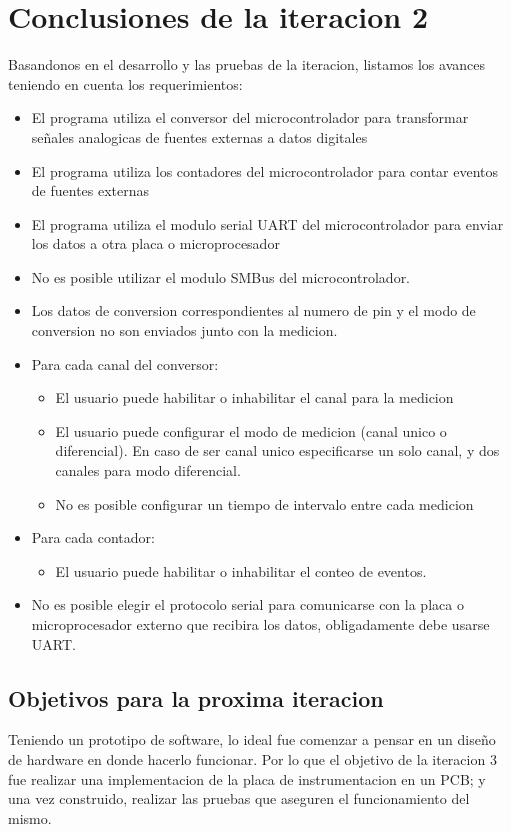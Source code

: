 \section{Conclusiones de la iteracion 2} %
\label{it2:sec:conclusiones_de_la_iteracion_2}

Basandonos en el desarrollo y las pruebas de la iteracion, listamos los avances teniendo en cuenta los requerimientos:

\begin{itemize}
\item El programa utiliza el conversor del microcontrolador para transformar señales analogicas de fuentes externas a datos digitales
\item El programa utiliza los contadores del microcontrolador para contar eventos de fuentes externas
\item El programa utiliza el modulo serial UART del microcontrolador para enviar los datos a otra placa o microprocesador
\item No es posible utilizar el modulo SMBus del microcontrolador.
\item Los datos de conversion correspondientes al numero de pin y el modo de conversion no son enviados junto con la medicion.
\item Para cada canal del conversor:
\begin{itemize}
\item El usuario puede habilitar o inhabilitar el canal para la medicion
\item El usuario puede configurar el modo de medicion (canal unico o diferencial). En caso de ser canal unico especificarse un solo canal, y dos canales para modo diferencial.
\item No es posible configurar un tiempo de intervalo entre cada medicion
\end{itemize}
\item Para cada contador:
\begin{itemize}
\item El usuario puede habilitar o inhabilitar el conteo de eventos.
\end{itemize}
\item No es posible elegir el protocolo serial para comunicarse con la placa o microprocesador externo que recibira los datos, obligadamente debe usarse UART.

\end{itemize}

\subsection{Objetivos para la proxima iteracion} %
\label{it2:sub:objetivos_para_la_proxima_iteracion}

Teniendo un prototipo de software, lo ideal fue comenzar a pensar en un diseño de hardware en donde hacerlo funcionar. Por lo que el objetivo de la iteracion 3 fue realizar una implementacion de la placa de instrumentacion en un PCB; y una vez construido, realizar las pruebas que aseguren el funcionamiento del mismo.



